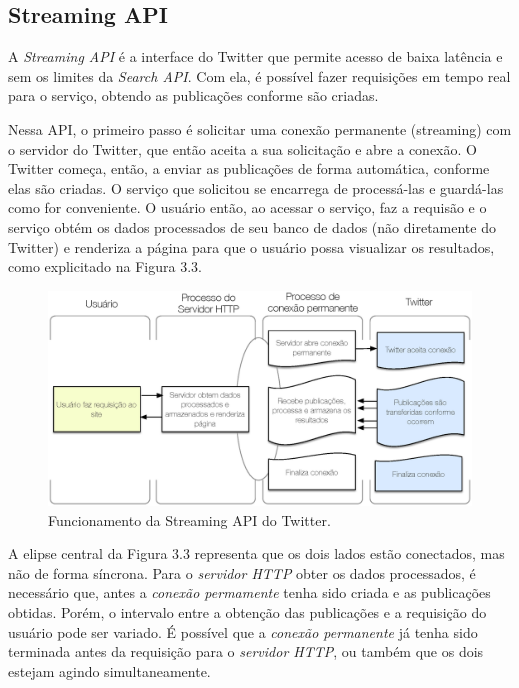 \subsection*{Streaming API}

A \textit{Streaming API} é a interface do Twitter que permite acesso de baixa latência e sem os limites da \textit{Search API}. Com ela, é possível fazer requisições em tempo real para o serviço, obtendo as publicações conforme são criadas.

Nessa API, o primeiro passo é solicitar uma conexão permanente (streaming) com o servidor do Twitter, que então aceita a sua solicitação e abre a conexão. O Twitter começa, então, a enviar as publicações de forma automática, conforme elas são criadas. O serviço que solicitou se encarrega de processá-las e guardá-las como for conveniente. O usuário então, ao acessar o serviço, faz a requisão e o serviço obtém os dados processados de seu banco de dados (não diretamente do Twitter) e renderiza a página para que o usuário possa visualizar os resultados, como explicitado na Figura 3.3.

\begin{figure}[htpb]
\begin{center}
\includegraphics[width=1.0\textwidth]{figuras/twitter-streaming-api.eps}
\caption{Funcionamento da Streaming API do Twitter.}
\end{center}
\end{figure}

A elipse central da Figura 3.3 representa que os dois lados estão conectados, mas não de forma síncrona. Para o \textit{servidor HTTP} obter os dados processados, é necessário que, antes a \textit{conexão permamente} tenha sido criada e as publicações obtidas. Porém, o intervalo entre a obtenção das publicações e a requisição do usuário pode ser variado. É possível que a \textit{conexão permanente} já tenha sido terminada antes da requisição para o \textit{servidor HTTP}, ou também que os dois estejam agindo simultaneamente.

